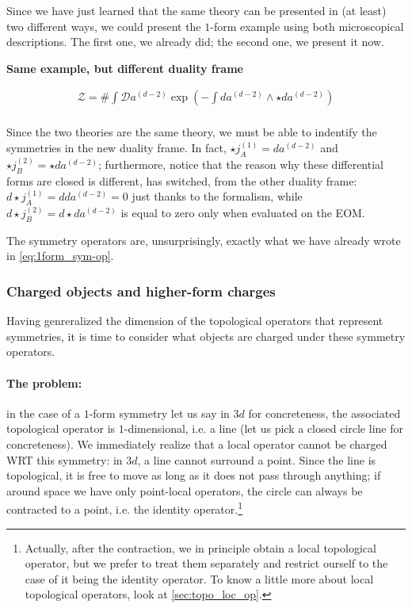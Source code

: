 \documentclass[aps,preprint,nofootinbib,preprintnumbers,eqsecnum,superscriptaddress]{revtex4}
\numberwithin{equation}{section}
\begin{document}
Since we have just learned that the same theory can be presented in (at least) two different ways, we could present the $1$-form example using both microscopical descriptions. The first one, we already did; the second one, we present it now.

\begin{tcolorbox}
    {\bf Same example, but different duality frame}
    
\begin{align}
    \mathcal{Z} = \# \int \mathcal{D}a^{(d-2)} \exp \left( -\int  da^{(d-2)} \wedge \star da^{(d-2)} \right) \\
\end{align}


Since the two theories are the same theory, we must be able to indentify the symmetries in the new duality frame. In fact, $\star j^{(1)}_A=da^{(d-2)}$ and $\star j^{(2)}_B=\star da^{(d-2)}$; furthermore, notice that the reason why these differential forms are closed is different, has switched, from the other duality frame: $d\star j^{(1)}_A=dda^{(d-2)}=0$ just thanks to the formalism, while $d\star j^{(2)}_B=d\star da^{(d-2)}$ is equal to zero only when evaluated on the EOM.

The symmetry operators are, unsurprisingly, exactly what we have already wrote in \ref{eq:1form_sym-op}.

    
\end{tcolorbox}
  
  \subsubsection{Charged objects and higher-form charges}
  
Having genreralized the dimension of the topological operators that represent symmetries, it is time to consider what objects are charged under these symmetry operators.

\paragraph*{The problem:} in the case of a $1$-form symmetry let us say in $3d$ for concreteness, the associated topological operator is $1$-dimensional, i.e. a line (let us pick a closed circle line for concreteness). We immediately realize that a local operator cannot be charged WRT this symmetry: in $3d$, a line cannot surround a point. Since the line is topological, it is free to move as long as it does not pass through anything; if around space we have only point-local operators, the circle can always be contracted to a point, i.e. the identity operator.\footnote{Actually, after the contraction, we in principle obtain a local topological operator, but we prefer to treat them separately and restrict ourself to the case of it being the identity operator. To know a little more about local topological operators, look at \ref{sec:topo_loc_op}.}
\end{document}
